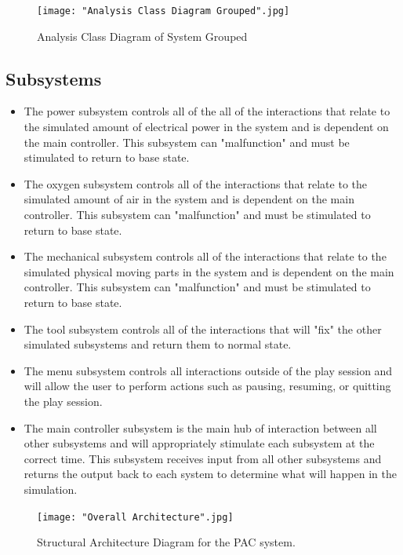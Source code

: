 \documentclass[12pt, titlepage]{article}
\begin{document}
\begin{figure}[ht!]
\centering
\texttt{[image: "Analysis Class Diagram Grouped".jpg]}
\caption{Analysis Class Diagram of System Grouped \label{analysisclassg}}
\end{figure}




\subsection{Subsystems}
\label{sub:subsystems}
\begin{itemize}
\item The power subsystem controls all of the all of the interactions that relate to the simulated amount of electrical power in the system and is dependent on the main controller. This subsystem can "malfunction" and must be stimulated to return to base state.
\item The oxygen subsystem controls all of the interactions that relate to the simulated amount of air in the system and is dependent on the main controller. This subsystem can "malfunction" and must be stimulated to return to base state.
\item The mechanical subsystem controls all of the interactions that relate to the simulated physical moving parts in the system and is dependent on the main controller. This subsystem can "malfunction" and must be stimulated to return to base state.
\item The tool subsystem controls all of the interactions that will "fix" the other simulated subsystems and return them to normal state.
\item The menu subsystem controls all interactions outside of the play session and will allow the user to perform actions such as pausing, resuming, or quitting the play session.
\item The main controller subsystem is the main hub of interaction between all other subsystems and will appropriately stimulate each subsystem at the correct time. This subsystem receives input from all other subsystems and returns the output back to each system to determine what will happen in the simulation.
\end{itemize}

\begin{figure}[h!]
  \centering
  \texttt{[image: "Overall Architecture".jpg]}
  \caption{Structural Architecture Diagram for the PAC system.}
\end{figure}
\end{document}
